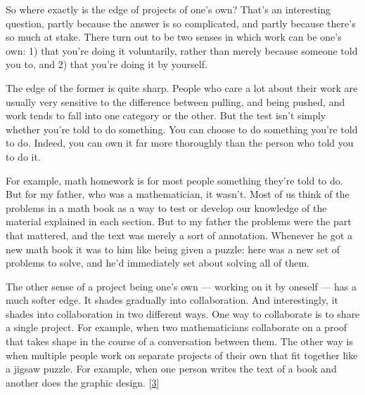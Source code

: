 So where exactly
                  is the edge of projects of one's own? That's an interesting
                  question, partly because the answer is so complicated, and
                  partly because there's so much at stake. There turn out to be
                  two senses in which work can be one's own: 1) that you're
                  doing it voluntarily, rather than merely because someone told
                  you to, and 2) that you're doing it by yourself.

The
                  edge of the former is quite sharp. People who care a lot about
                  their work are usually very sensitive to the difference
                  between pulling, and being pushed, and work tends to fall into
                  one category or the other. But the test isn't simply whether
                  you're told to do something. You can choose to do something
                  you're told to do. Indeed, you can own it far more thoroughly
                  than the person who told you to do it.

For example,
                  math homework is for most people something they're told to do.
                  But for my father, who was a mathematician, it wasn't. Most of
                  us think of the problems in a math book as a way to test or
                  develop our knowledge of the material explained in each
                  section. But to my father the problems were the part that
                  mattered, and the text was merely a sort of annotation.
                  Whenever he got a new math book it was to him like being given
                  a puzzle: here was a new set of problems to solve, and he'd
                  immediately set about solving all of them.

The
                  other sense of a project being one's own --- working on it
                  by oneself --- has a much softer edge. It shades gradually
                  into collaboration. And interestingly, it shades into
                  collaboration in two different ways. One way to collaborate is
                  to share a single project. For example, when two
                  mathematicians collaborate on a proof that takes shape in the
                  course of a conversation between them. The other way is when
                  multiple people work on separate projects of their own that
                  fit together like a jigsaw puzzle. For example, when one
                  person writes the text of a book and another does the graphic
                  design.
                  [\href{\#f3n}{3}]

